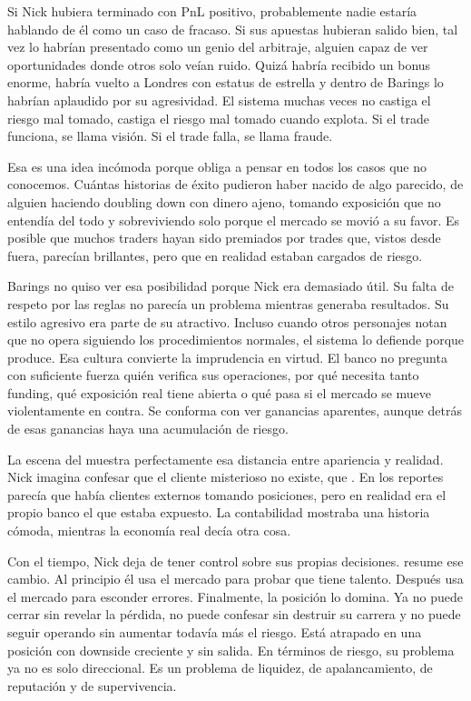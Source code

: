 Si Nick hubiera terminado con PnL positivo, probablemente nadie estaría hablando de él como un caso de fracaso. Si sus apuestas hubieran salido bien, tal vez lo habrían presentado como un genio del arbitraje,  alguien capaz de ver oportunidades donde otros solo veían ruido. Quizá habría recibido un bonus enorme, habría vuelto a Londres con estatus de estrella y dentro de Barings lo habrían aplaudido por su agresividad. El sistema muchas veces no castiga el riesgo mal tomado, castiga el riesgo mal tomado cuando explota. Si el trade funciona, se llama visión. Si el trade falla, se llama fraude.

Esa es una idea incómoda porque obliga a pensar en todos los casos que no conocemos. Cuántas historias de éxito pudieron haber nacido de algo parecido, de alguien haciendo doubling down con dinero ajeno, tomando exposición que no entendía del todo y sobreviviendo solo porque el mercado se movió a su favor. Es posible que muchos traders hayan sido premiados por trades que, vistos desde fuera, parecían brillantes, pero que en realidad estaban cargados de riesgo. 

Barings no quiso ver esa posibilidad porque Nick era demasiado útil. Su falta de respeto por las reglas no parecía un problema mientras generaba resultados. Su estilo agresivo era parte de su atractivo. Incluso cuando otros personajes notan que no opera siguiendo los procedimientos normales, el sistema lo defiende porque produce. Esa cultura convierte la imprudencia en virtud. El banco no pregunta con suficiente fuerza quién verifica sus operaciones, por qué necesita tanto funding, qué exposición real tiene abierta o qué pasa si el mercado se mueve violentamente en contra. Se conforma con ver ganancias aparentes, aunque detrás de esas ganancias haya una acumulación de riesgo.

La escena del  muestra perfectamente esa distancia entre apariencia y realidad. Nick imagina confesar que el cliente misterioso no existe, que . En los reportes parecía que había clientes externos tomando posiciones, pero en realidad era el propio banco el que estaba expuesto. La contabilidad mostraba una historia cómoda, mientras la economía real decía otra cosa. 

Con el tiempo, Nick deja de tener control sobre sus propias decisiones.   resume ese cambio. Al principio él usa el mercado para probar que tiene talento. Después usa el mercado para esconder errores. Finalmente, la posición lo domina. Ya no puede cerrar sin revelar la pérdida, no puede confesar sin destruir su carrera y no puede seguir operando sin aumentar todavía más el riesgo. Está atrapado en una posición con downside creciente y sin salida. En términos de riesgo, su problema ya no es solo direccional. Es un problema de liquidez, de apalancamiento, de reputación y de supervivencia.

